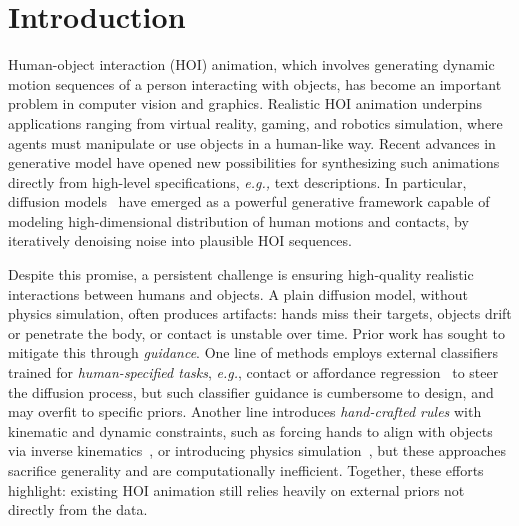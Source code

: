 \section{Introduction}

Human-object interaction (HOI) animation, which involves generating dynamic motion sequences of a person interacting with objects, has become an important problem in computer vision and graphics. Realistic HOI animation underpins applications ranging from virtual reality, gaming, and robotics simulation, where agents must manipulate or use objects in a human-like way. Recent advances in generative model have opened new possibilities for synthesizing such animations directly from high-level specifications, \textit{e.g.,} text descriptions. In particular, diffusion models~\citep{peng2023hoi,diller2023cg,li2023controllable} have emerged as a powerful generative framework capable of modeling high-dimensional distribution of human motions and contacts, by iteratively denoising noise into plausible HOI sequences.

Despite this promise, a persistent challenge is ensuring high-quality realistic interactions between humans and objects. A plain diffusion model, without physics simulation, often produces artifacts: hands miss their targets, objects drift or penetrate the body, or contact is unstable over time. Prior work has sought to mitigate this through \textit{guidance}. One line of methods employs external classifiers trained for \textit{human-specified tasks}, \textit{e.g.}, contact or affordance regression~\citep{peng2023hoi,diller2023cg} to steer the diffusion process, but such classifier guidance is cumbersome to design, and may overfit to specific priors. Another line introduces \textit{hand-crafted rules} with kinematic and dynamic constraints, such as forcing hands to align with objects via inverse kinematics~\citep{xu2024interdreamer}, or introducing physics simulation~\citep{xu2025intermimic,xu2026interprior}, but these approaches sacrifice generality and are computationally inefficient. Together, these efforts highlight: existing HOI animation still relies heavily on external priors not directly from the data.

